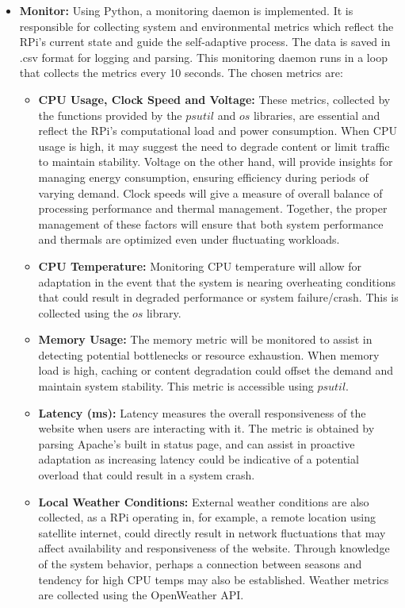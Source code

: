 \documentclass[conference]{IEEEtran}
\begin{document}
\begin{itemize}
    \item \textbf{Monitor:}
          Using Python, a monitoring daemon is implemented. It is responsible for collecting system and environmental metrics which reflect the RPi's current state and guide the self-adaptive process. The data is saved in .csv format for logging and parsing. This monitoring daemon runs in a loop that collects the metrics every 10 seconds. The chosen metrics are:

          \begin{itemize}
              \item \textbf{CPU Usage, Clock Speed and Voltage:}
                    These metrics, collected by the functions provided by the $psutil$ and $os$ libraries, are essential and reflect the RPi's computational load and power consumption. When CPU usage is high, it may suggest the need to degrade content or limit traffic to maintain stability. Voltage on the other hand, will provide insights for managing energy consumption, ensuring efficiency during periods of varying demand. Clock speeds will give a measure of overall balance of processing performance and thermal management. Together, the proper management of these factors will ensure that both system performance and thermals are optimized even under fluctuating workloads.
              \item \textbf{CPU Temperature:}
                    Monitoring CPU temperature will allow for adaptation in the event that the system is nearing overheating conditions that could result in degraded performance or system failure/crash. This is collected using the $os$ library.
              \item \textbf{Memory Usage:}
                    The memory metric will be monitored to assist in detecting potential bottlenecks or resource exhaustion. When memory load is high, caching or content degradation could offset the demand and maintain system stability. This metric is accessible using $psutil$.
              \item \textbf{Latency (ms):}
                    Latency measures the overall responsiveness of the website when users are interacting with it. The metric is obtained by parsing Apache's built in status page, and can assist in proactive adaptation as increasing latency could be indicative of a potential overload that could result in a system crash.
              \item \textbf{Local Weather Conditions:}
                    External weather conditions are also collected, as a RPi operating in, for example, a remote location using satellite internet, could directly result in network fluctuations that may affect availability and responsiveness of the website. Through knowledge of the system behavior, perhaps a connection between seasons and tendency for high CPU temps may also be established. Weather metrics are collected using the OpenWeather API.
          \end{itemize}


\end{itemize}
\end{document}
